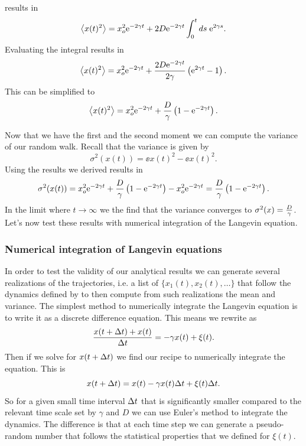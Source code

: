 results in
\begin{equation}
   \left\langle x(t)^2 \right\rangle = 
   x_o^2 \mathrm{e}^{-2\gamma t} +
   2D \mathrm{e}^{-2 \gamma t} \int_0^t ds\; \mathrm{e}^{2 \gamma s}.
\end{equation}
Evaluating the integral results in
\begin{equation}
   \left\langle x(t)^2 \right\rangle = 
   x_o^2 \mathrm{e}^{-2\gamma t} +
   {2D \mathrm{e}^{-2\gamma t} \over 2 \gamma}\left( \mathrm{e}^{2 \gamma t} - 1 \right).
\end{equation}
This can be simplified to
\begin{equation}
   \left\langle x(t)^2 \right\rangle = 
   x_o^2 \mathrm{e}^{-2\gamma t} +
   {D \over \gamma} \left( 1 - \mathrm{e}^{-2 \gamma t} \right).
\end{equation}

Now that we have the first and the second moment we can compute the variance of
our random walk. Recall that the variance is given by
\begin{equation}
  \sigma^2(x(t)) = \ee{x(t)^2} - \ee{x(t)}^2.
  \label{eq_walker_var}
\end{equation}
Using the results we derived results in
\begin{equation}
  \sigma^2(x(t)) = x_o^2 \mathrm{e}^{-2\gamma t} +
   {D \over \gamma} \left( 1 - \mathrm{e}^{-2 \gamma t} \right) -
   x_o^2 \mathrm{e}^{-2\gamma t} = 
   {D \over \gamma} \left( 1 - \mathrm{e}^{-2 \gamma t} \right).
\end{equation}
In the limit where $t \rightarrow \infty$ we the find that the variance
converges to $\sigma^2(x) = {D \over \gamma}$. Let's now test these results
with numerical integration of the Langevin equation.

\subsubsection{Numerical integration of Langevin equations}

In order to test the validity of our analytical results we can generate several
realizations of the trajectories, i.e. a list of $\{x_1(t), x_2(t), \ldots \}$
that follow the dynamics defined by  to then
compute from such realizations the mean and variance. The simplest method to
numerically integrate the Langevin equation is to write it as a discrete
difference equation. This means we rewrite  as
\begin{equation}
  {x(t + \Delta t) + x(t) \over \Delta t} = -\gamma x(t) + \xi(t).
\end{equation}
Then if we solve for $x(t + \Delta t)$ we find our recipe to numerically integrate
the equation. This is
\begin{equation}
  x(t + \Delta t) = x(t) - \gamma x(t) \Delta t + \xi(t) \Delta t.
  \label{eq_discrete_walker}
\end{equation}
So for a given small time interval $\Delta t$ that is significantly smaller compared
to the relevant time scale set by $\gamma$ and $D$ we can use Euler's method to
integrate the dynamics. The difference is that at each time step we can
generate a pseudo-random number that follows the statistical properties that we
defined for $\xi(t)$.


